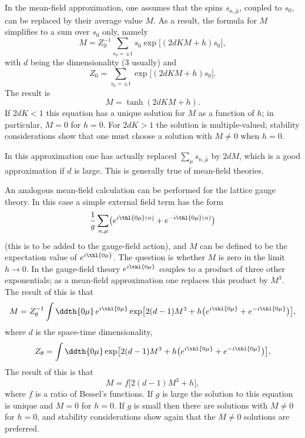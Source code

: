 In the mean-field approximation, one assumes that the spins
$s_{n,\hat\mu}$, coupled to $s_{0}$, can be replaced by their average
value $M$.  As a result, the formula for $M$ simplifies to a sum over
$s_{0}$ only, namely
\begin{equation}
M = Z_{0}^{-1}\sum_{s_{0}=\pm 1}s_{0}\exp\bigl[(2dKM+h)s_{0}\bigr],
\label{eq:6.4}
\end{equation}
with $d$ being the dimensionality (3 usually) and
\begin{equation}
Z_{0} = \sum_{s_{0}=\pm 1}\exp\bigl[(2dKM+h)s_{0}\bigr].
\label{eq:6.5}
\end{equation}
The result is
\begin{equation}
M = \tanh(2dKM+h).
\label{eq:6.6}
\end{equation}
If $2dK<1$ this equation has a unique solution for $M$ as a function of
$h$; in particular, $M=0$ for $h=0$.  For $2dK>1$ the solution is
multiple-valued; stability considerations show that one must choose a
solution with $M\ne0$ when $h=0$.

In this approximation one has actually replaced $\sum_{\mu}s_{n,\hat\mu}$
by $2dM$, which is a good approximation if $d$ is large.  This is
generally true of mean-field theories.

An analogous mean-field calculation can be performed for the lattice
gauge theory.  In this case a simple external field term has the form
\[
\frac{1}{g}\sum_{n,\mu}\bigl(e^{i\thl{0\mu}(n)}+e^{-i\thl{0\mu}(n)}\bigr)
\]
(this is to be added to the gauge-field action), and $M$ can be defined
to be the expectation value of $e^{i\thl{0\mu}}$.  The question is
whether $M$ is zero in the limit $h\to0$.  In the gauge-field theory
$e^{i\thl{0\mu}}$ couples to a product of three other exponentials; as a
mean-field approximation one replaces this product by $M^{3}$.  The
result of this is that
\begin{equation}
M = Z_{\theta}^{-1}\int\ddth{0\mu}\,e^{i\thl{0\mu}}
  \exp\bigl[2(d-1)M^{3}+h\bigl(e^{i\thl{0\mu}}+e^{-i\thl{0\mu}}\bigr)\bigr],
\label{eq:6.7}
\end{equation}
where $d$ is the space-time dimensionality,
\begin{equation}
Z_{\theta} = \int\ddth{0\mu}
  \exp\bigl[2(d-1)M^{3}+h\bigl(e^{i\thl{0\mu}}+e^{-i\thl{0\mu}}\bigr)\bigr],
\label{eq:6.8}
\end{equation}
The result of this is that
\begin{equation}
M = f\bigl[2(d-1)M^{3}+h\bigr],
\label{eq:6.9}
\end{equation}
where $f$ is a ratio of Bessel's functions.  If $g$ is large the
solution to this equation is unique and $M=0$ for $h=0$.  If $g$ is
small then there are solutions with $M\ne0$ for $h=0$, and stability
considerations show again that the $M\ne0$ solutions are preferred.

